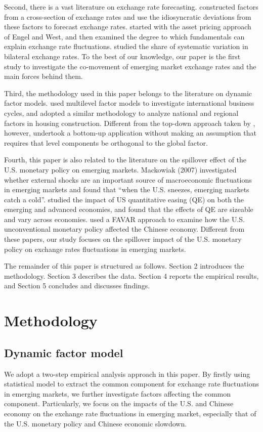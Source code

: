 \documentclass[12pt]{article}
\numberwithin{equation}{section}
\begin{document}
Second, there is a vast literature on exchange rate forecasting. \cite{EngelMarkWest2015} constructed factors from a cross-section of exchange rates and use the idiosyncratic deviations from these factors to forecast exchange rates. \cite{BalkeMaWohar2013} started with the asset pricing approach of Engel and West, and then examined the degree to which fundamentals can explain exchange rate fluctuations. \cite{Verdelhan2012} studied the share of systematic variation in bilateral exchange rates. To the best of our knowledge, our paper is the first study to investigate the co-movement of emerging market exchange rates and the main forces behind them.

Third, the methodology used in this paper belongs to the literature on dynamic factor models. \cite{KoseOtrokWhiteman2003} used multilevel factor models to investigate international business cycles, and \cite{StockWatson1989} adopted a similar methodology to analyze national and regional factors in housing construction. Different from the top-down approach taken by \cite{KoseOtrokWhiteman2003}, however, \cite{Moenchetal2013} undertook a bottom-up application without making an assumption that requires that level components be orthogonal to the global factor.

Fourth, this paper is also related to the literature on the spillover effect of the U.S. monetary policy on emerging markets. Mackowiak (2007) investigated whether external shocks are an important source of macroeconomic fluctuations in emerging markets and found that ``when the U.S. sneezes, emerging markets catch a cold''. \cite{ChenFiladoHeZhu2015} studied the impact of US quantitative easing (QE) on both the emerging and advanced economies, and found that the effects of QE are sizeable and vary across economies. \cite{HoZhangZhou2018} used a FAVAR approach to examine how the U.S. unconventional monetary policy affected the Chinese economy. Different from these papers, our study focuses on the spillover impact of the U.S. monetary policy on exchange rates fluctuations in emerging markets.

The remainder of this paper is structured as follows. Section 2 introduces the methodology. Section 3 describes the data. Section 4 reports the empirical results, and Section 5 concludes and discusses findings.
\section{Methodology}
\subsection{Dynamic factor model}
We adopt a two-step empirical analysis approach in this paper. By firstly using statistical model to extract the common component for exchange rate fluctuations in emerging markets, we further investigate factors affecting the common component. Particularly, we focus on the impacts of the U.S. and Chinese economy on the exchange rate fluctuations in emerging market, especially that of the U.S. monetary policy and Chinese economic slowdown.
\end{document}
